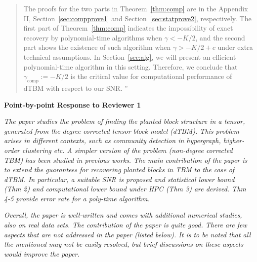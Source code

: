 \documentclass[11pt]{article}
\theoremstyle{definition}
\theoremstyle{definition}
\begin{document}
\begin{enumerate}[wide, labelwidth=!, labelindent=0pt]
\begin{quote}
The proofs for the two parts in Theorem~\ref{thm:comp} are in the Appendix II, Section~\ref{sec:compprove1} and Section~\ref{sec:statprove2}, respectively. The first part of Theorem~\ref{thm:comp} indicates the impossibility of exact recovery by polynomial-time algorithms when $\gamma < -K/2$, and the second part shows the existence of such algorithm when $\gamma > -K/2+c$ under extra technical assumptions. In Section~\ref{sec:alg}, we will present an efficient polynomial-time algorithm in this setting. Therefore, we conclude that $\gamma_{\text{comp}}:=-K/2$ is the critical value for computational performance of dTBM with respect to our SNR. ''
\end{quote}

\end{enumerate}



\newpage 

\begin{center}
    \textbf{Point-by-point Response to Reviewer 1}
\end{center}

\textit{The paper studies the problem of finding the planted block structure in a tensor, generated from the degree-corrected tensor block model (dTBM). This problem arises in different contexts, such as community detection in hypergraph, higher-order clustering etc. A simpler version of the problem (non-degree corrected TBM) has been studied in previous works. The main contribution of the paper is to extend the guarantees for recovering planted blocks in TBM to the case of dTBM. In particular, a suitable SNR is proposed and statistical lower bound (Thm 2) and computational lower bound under HPC (Thm 3) are derived. Thm 4-5 provide error rate for a poly-time algorithm.}

\textit{Overall, the paper is well-written and comes with additional numerical studies, also on real data sets. The contribution of the paper is quite good. There are few aspects that are not addressed in the paper (listed below). It is to be noted that all the mentioned may not be easily resolved, but brief discussions on these aspects would improve the paper.}
\end{document}
